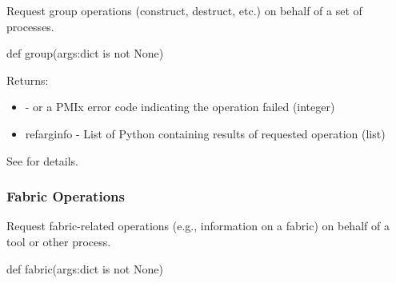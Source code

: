 \summary

Request group operations (construct, destruct, etc.) on behalf of a set of processes.

\format

\pyspecificstart
\begin{codepar}
def group(args:dict is not None)
\end{codepar}
\pyspecificend

\begin{arglist}
\end{arglist}

Returns:
\begin{itemize}
    \item {} -  or a \ac{PMIx} error code indicating the operation failed (integer)
    \item refarg{info} - List of Python  containing results of requested operation (list)
\end{itemize}

See  for details.


\subsubsection{Fabric Operations}

\summary

Request fabric-related operations (e.g., information on a fabric) on behalf of a tool or other process.

\format

\pyspecificstart
\begin{codepar}
def fabric(args:dict is not None)
\end{codepar}
\pyspecificend

